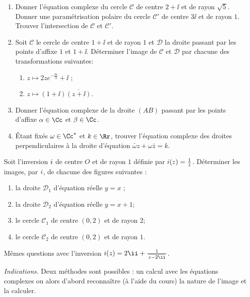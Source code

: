 \documentclass[11pt,class=report,crop=false]{standalone}
\begin{document}
\begin{exercicecours}
\sauteligne
\begin{enumerate}
 
 \item Donner l'équation complexe du cercle $\mathcal{C}$ de centre $2+\ii$ et de rayon $\sqrt{5}$.
 Donner une paramétrisation polaire du cercle $\mathcal{C}'$ de centre $3\ii$ et de rayon $1$.
 Trouver l'intersection de $\mathcal{C}$ et  $\mathcal{C}'$.
 
 \item Soit $\mathcal{C}$ le cercle de centre $1+\ii$ et de rayon $1$ 
 et $\mathcal{D}$ la droite passant par les points d'affixe $1$ et $1+\ii$.
 Déterminer l'image de  $\mathcal{C}$ et $\mathcal{D}$ par chacune des transformations suivantes:
   \begin{enumerate}
     \item $z \mapsto 2 z e^{-\frac{\ii\pi}{4}} + \ii$ ;
     \item $z \mapsto (1+\ii)\overline{(z+\ii)}$.
   \end{enumerate}
   



 \item Donner l'équation complexe de la droite $(AB)$ passant par les points d'affixe $\alpha \in \Cc$ et $\beta\in \Cc$.
 
 \item \'Etant fixés $\omega \in \Cc^*$ et $k\in \Rr$, trouver l'équation complexe des droites perpendiculaires à la droite d'équation $\bar \omega z + \omega \bar z = k$.

\end{enumerate}
\end{exercicecours}


\begin{exercicecours}[Inversion]

Soit l'inversion $i$ de centre $O$ et de rayon $1$ définie par $i(z) = \frac{1}{\bar z}$.
Déterminer les images, par $i$, de chacune des figures suivantes :


\begin{enumerate}
 \item la droite $\mathcal{D}_1$ d'équation réelle $y=x$ ;
 \item la droite $\mathcal{D}_2$ d'équation réelle $y=x+1$;
 \item le cercle $\mathcal{C}_1$ de centre $(0,2)$ et de rayon $2$;
 \item le cercle $\mathcal{C}_2$ de centre $(0,2)$ et de rayon $1$.
\end{enumerate}


Mêmes questions avec l'inversion $\inversion(z) = 2\ii + \frac{1}{\,\overline{z-2\ii}\,}$.

\emph{Indications.} Deux méthodes sont possibles : un calcul avec les équations complexes
ou alors d'abord reconnaître (à l'aide du cours) la nature de l'image et la calculer.
\end{exercicecours}
\end{document}
